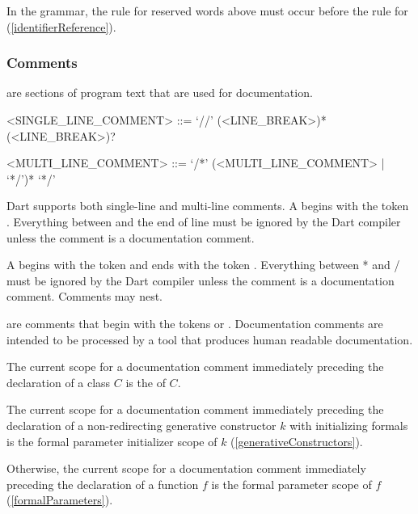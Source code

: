 \documentclass[makeidx]{article}
\begin{document}
{\LMHash{}%
In the grammar, the rule for reserved words above must occur
before the rule for 
(\ref{identifierReference}).



\subsubsection{Comments}

\LMHash{}%
are sections of program text that are used for documentation.

\begin{grammar}
<SINGLE\_LINE\_COMMENT> ::= \gnewline{}
  `//' \gtilde(<LINE\_BREAK>)* (<LINE\_BREAK>)?

<MULTI\_LINE\_COMMENT> ::= \gnewline{}
  `/*' (<MULTI\_LINE\_COMMENT> | \gtilde{} `*/')* `*/'
\end{grammar}

\LMHash{}%
Dart supports both single-line and multi-line comments.
A  begins with the token \code{//}.
Everything between \code{//} and the end of line
must be ignored by the Dart compiler
unless the comment is a documentation comment.

\LMHash{}%
A  begins with the token \code{/*}
and ends with the token \code{*/}.
Everything between \code{/}* and \code{*}/
must be ignored by the Dart compiler
unless the comment is a documentation comment.
Comments may nest.

\LMHash{}%
are comments that begin with the tokens \code{///} or \code{/**}.
Documentation comments are intended to be processed by
a tool that produces human readable documentation.

\LMHash{}%
The current scope for a documentation comment immediately preceding
the declaration of a class $C$ is the
of $C$.

\LMHash{}%
The current scope for a documentation comment immediately preceding
the declaration of a non-redirecting generative constructor $k$
with initializing formals is the formal parameter initializer scope of $k$
(\ref{generativeConstructors}).

\LMHash{}%
Otherwise, the current scope for a documentation comment immediately preceding
the declaration of a function $f$ is the formal parameter scope of $f$
(\ref{formalParameters}).


}
\end{document}
